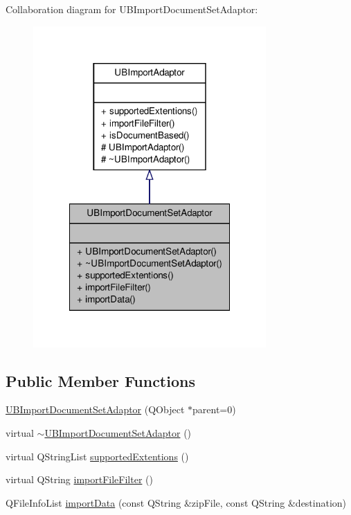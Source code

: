 Collaboration diagram for U\-B\-Import\-Document\-Set\-Adaptor\-:
\nopagebreak
\begin{figure}[H]
\begin{center}
\leavevmode
\includegraphics[width=252pt]{d6/db7/class_u_b_import_document_set_adaptor__coll__graph}
\end{center}
\end{figure}
\subsection*{Public Member Functions}
\begin{DoxyCompactItemize}
\item 
\hyperlink{class_u_b_import_document_set_adaptor_a3a8967112d82040424e5483e8f898432}{U\-B\-Import\-Document\-Set\-Adaptor} (Q\-Object $\ast$parent=0)
\item 
virtual \hyperlink{class_u_b_import_document_set_adaptor_ae799107e1fed35cec7477c5b115b7c00}{$\sim$\-U\-B\-Import\-Document\-Set\-Adaptor} ()
\item 
virtual Q\-String\-List \hyperlink{class_u_b_import_document_set_adaptor_a8cfc0c8be557340a3dee842bf4aea247}{supported\-Extentions} ()
\item 
virtual Q\-String \hyperlink{class_u_b_import_document_set_adaptor_a83646f54cc71ddcc1deb6285a7efb0ba}{import\-File\-Filter} ()
\item 
Q\-File\-Info\-List \hyperlink{class_u_b_import_document_set_adaptor_a119a7f90a0176d6ee334a505815f1713}{import\-Data} (const Q\-String \&zip\-File, const Q\-String \&destination)
\end{DoxyCompactItemize}
